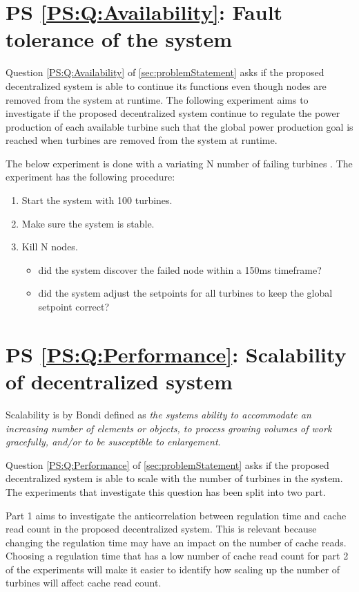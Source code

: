 \section{PS \ref{PS:Q:Availability}: Fault tolerance of the system}
Question \ref{PS:Q:Availability} of \cref{sec:problemStatement} asks if the proposed decentralized system is able to continue its functions even though nodes are removed from the system at runtime. The following experiment aims to investigate if the proposed decentralized system continue to regulate the power production of each available turbine such that the global power production goal is reached when turbines are removed from the system at runtime. 

The below experiment is done with a variating N number of failing turbines \failingTurbineNumbers.
The experiment has the following procedure:
\begin{enumerate}
	\item Start the system with 100 turbines.
	\item Make sure the system is stable.
	\item Kill N nodes.
	\begin{itemize}
		\item did the system discover the failed node within a 150ms timeframe?
		\item did the system adjust the setpoints for all turbines to keep the global setpoint correct?
	\end{itemize}
\end{enumerate}


\section{PS \ref{PS:Q:Performance}: Scalability of decentralized system}
Scalability is by Bondi\cite{Bondi:2000:CSI:350391.350432} defined as \textit{the systems ability to accommodate an increasing number of elements or objects, to process growing volumes of work gracefully, and/or to be susceptible to enlargement}.

Question \ref{PS:Q:Performance} of \cref{sec:problemStatement} asks if the proposed decentralized system is able to scale with the number of turbines in the system. The experiments that investigate this question has been split into two part.  \newline

Part 1 aims to investigate the anticorrelation between regulation time and cache read count in the proposed decentralized system. This is relevant because changing the regulation time may have an impact on the number of cache reads. Choosing a regulation time that has a low number of cache read count for part 2 of the experiments will make it easier to identify how scaling up the number of turbines will affect cache read count. \newline

